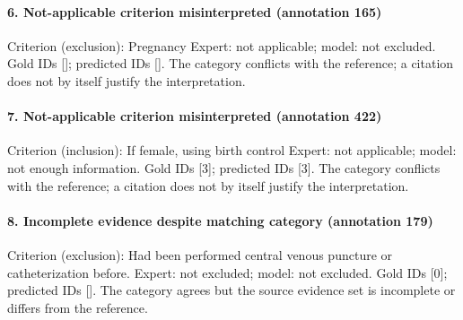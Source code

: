 \paragraph{6. Not-applicable criterion misinterpreted (annotation 165)}
Criterion (exclusion): Pregnancy Expert: not applicable; model: not excluded. Gold IDs []; predicted IDs []. The category conflicts with the reference; a citation does not by itself justify the interpretation.

\paragraph{7. Not-applicable criterion misinterpreted (annotation 422)}
Criterion (inclusion): If female, using birth control Expert: not applicable; model: not enough information. Gold IDs [3]; predicted IDs [3]. The category conflicts with the reference; a citation does not by itself justify the interpretation.

\paragraph{8. Incomplete evidence despite matching category (annotation 179)}
Criterion (exclusion): Had been performed central venous puncture or catheterization before. Expert: not excluded; model: not excluded. Gold IDs [0]; predicted IDs []. The category agrees but the source evidence set is incomplete or differs from the reference.

